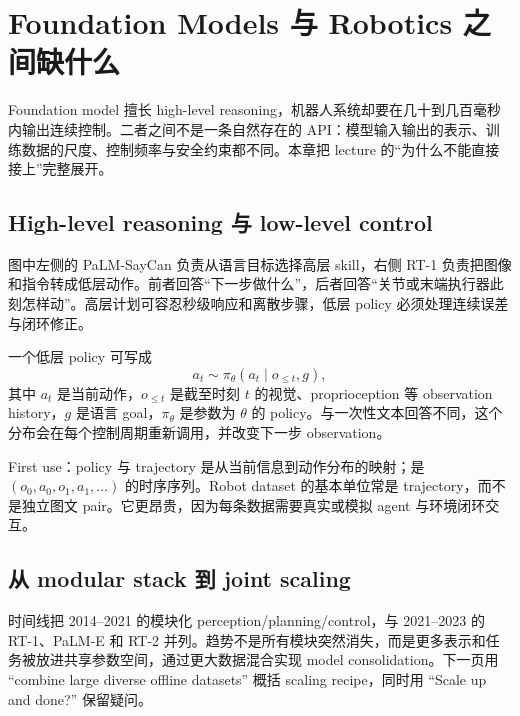\section{Foundation Models 与 Robotics 之间缺什么}

Foundation model 擅长 high-level reasoning，机器人系统却要在几十到几百毫秒内输出连续控制。二者之间不是一条自然存在的 API：模型输入输出的表示、训练数据的尺度、控制频率与安全约束都不同。本章把 lecture 的“为什么不能直接接上”完整展开。

\subsection{High-level reasoning 与 low-level control}

图中左侧的 PaLM-SayCan 负责从语言目标选择高层 skill，右侧 RT-1 负责把图像和指令转成低层动作。前者回答“下一步做什么”，后者回答“关节或末端执行器此刻怎样动”。高层计划可容忍秒级响应和离散步骤，低层 policy 必须处理连续误差与闭环修正。


一个低层 policy 可写成
$$
a_t\sim \pi_\theta(a_t\mid o_{\le t},g),
$$
其中 $a_t$ 是当前动作，$o_{\le t}$ 是截至时刻 $t$ 的视觉、proprioception 等 observation history，$g$ 是语言 goal，$\pi_\theta$ 是参数为 $\theta$ 的 policy。与一次性文本回答不同，这个分布会在每个控制周期重新调用，并改变下一步 observation。

\begin{importantbox}{First use：policy 与 trajectory}
是从当前信息到动作分布的映射；是 $(o_0,a_0,o_1,a_1,\ldots)$ 的时序序列。Robot dataset 的基本单位常是 trajectory，而不是独立图文 pair。它更昂贵，因为每条数据需要真实或模拟 agent 与环境闭环交互。
\end{importantbox}

\subsection{从 modular stack 到 joint scaling}

时间线把 2014--2021 的模块化 perception/planning/control，与 2021--2023 的 RT-1、PaLM-E 和 RT-2 并列。趋势不是所有模块突然消失，而是更多表示和任务被放进共享参数空间，通过更大数据混合实现 model consolidation。下一页用 “combine large diverse offline datasets” 概括 scaling recipe，同时用 “Scale up and done?” 保留疑问。


